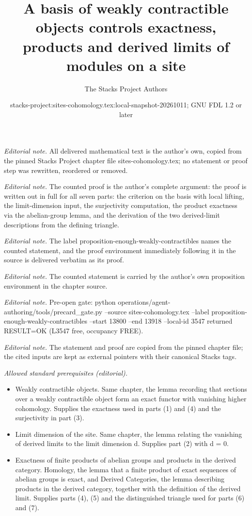 \documentclass[10pt,a4paper]{amsart}
\title{A basis of weakly contractible objects controls exactness, products and derived limits of modules on a site}
\author{The Stacks Project Authors}
\date{stacks-project:sites-cohomology.tex:local-snapshot-20261011; GNU FDL 1.2 or later}
\theoremstyle{plain}
\theoremstyle{definition}
\theoremstyle{remark}
\numberwithin{equation}{subsection}
\begin{document}
\maketitle
\noindent\textit{Editorial note.} All delivered mathematical text is the author's own, copied from the pinned Stacks Project chapter file sites-cohomology.tex; no statement or proof step was rewritten, reordered or removed.\par\medskip
\noindent\textit{Editorial note.} The counted proof is the author's complete argument: the proof is written out in full for all seven parts: the criterion on the basis with local lifting, the limit-dimension input, the surjectivity computation, the product exactness via the abelian-group lemma, and the derivation of the two derived-limit descriptions from the defining triangle.\par\medskip
\noindent\textit{Editorial note.} The label proposition-enough-weakly-contractibles names the counted statement, and the proof environment immediately following it in the source is delivered verbatim as its proof.\par\medskip
\noindent\textit{Editorial note.} The counted statement is carried by the author's own proposition environment in the chapter source.\par\medskip
\noindent\textit{Editorial note.} Pre-open gate: python operations/agent-authoring/tools/precard\_gate.py --source sites-cohomology.tex --label proposition-enough-weakly-contractibles --start 13800 --end 13918 --local-id 3547 returned RESULT=OK (L3547 free, occupancy FREE).\par\medskip
\noindent\textit{Editorial note.} The statement and proof are copied from the pinned chapter file; the cited inputs are kept as external pointers with their canonical Stacks tags.\par\medskip
\noindent\textit{Allowed standard prerequisites (editorial).}\begin{itemize}
\item Weakly contractible objects. Same chapter, the lemma recording that sections over a weakly contractible object form an exact functor with vanishing higher cohomology. Supplies the exactness used in parts (1) and (4) and the surjectivity in part (3).
\item Limit dimension of the site. Same chapter, the lemma relating the vanishing of derived limits to the limit dimension d. Supplies part (2) with d = 0.
\item Exactness of finite products of abelian groups and products in the derived category. Homology, the lemma that a finite product of exact sequences of abelian groups is exact, and Derived Categories, the lemma describing products in the derived category, together with the definition of the derived limit. Supplies parts (4), (5) and the distinguished triangle used for parts (6) and (7).
\end{itemize}\medskip
\end{document}
